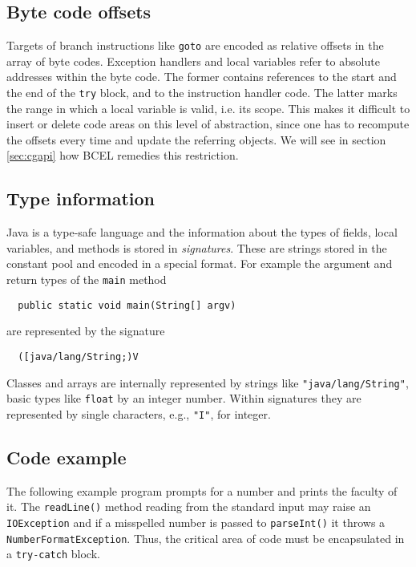 \documentclass[12pt,twoside]{article}
\newcommand\jc{{\sffamily BCEL }}
\newcommand\cp{{constant pool }}
\begin{document}
\subsection{Byte code offsets}\label{sec:offsets}

Targets  of  branch instructions  like  \texttt{goto}  are encoded  as
relative offsets  in the array  of byte codes. Exception  handlers and
local variables refer to absolute addresses within the byte code.  The
former  contains  references   to  the  start  and  the   end  of  the
\texttt{try} block,  and to the instruction handler  code.  The latter
marks the  range in which a  local variable is valid,  i.e. its scope.
This makes it  difficult to insert or delete code  areas on this level
of abstraction, since one has  to recompute the offsets every time and
update the referring objects. We will see in section \ref{sec:cgapi}
how \jc remedies this restriction.

\subsection{Type information}\label{sec:types}

Java is  a type-safe language and  the information about  the types of
fields,    local    variables,    and    methods    is    stored    in
\emph{signatures}. These are strings stored  in the \cp and encoded in
a special  format.  For example the  argument and return  types of the
\texttt{main} method

\begin{verbatim}
  public static void main(String[] argv)
\end{verbatim}

are represented by the signature

\begin{verbatim}
  ([java/lang/String;)V
\end{verbatim}

Classes  and  arrays  are   internally  represented  by  strings  like
\texttt{"java/lang/String"},  basic types  like  \texttt{float} by  an
integer number. Within signatures they are represented by single
characters, e.g., \texttt{"I"}, for integer.

\subsection{Code example}\label{sec:fac}

The  following example  program prompts  for a  number and  prints the
faculty  of  it.  The  \texttt{readLine()}  method  reading  from  the
standard input  may raise an \texttt{IOException} and  if a misspelled
number    is    passed   to    \texttt{parseInt()}    it   throws    a
\texttt{NumberFormatException}. Thus, the critical area of code must be
encapsulated in a \texttt{try-catch} block.
\end{document}
